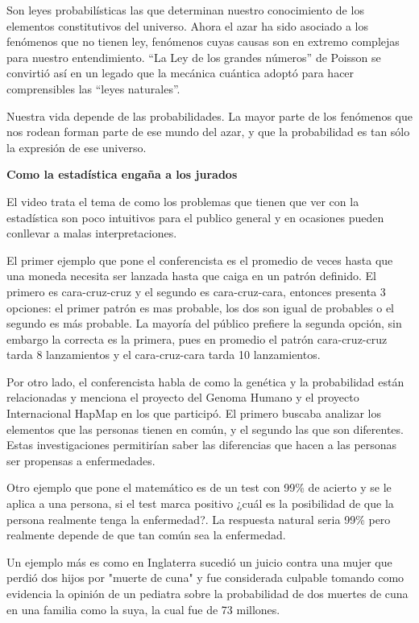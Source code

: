 \documentclass{article}[12pt]
\begin{document}
    Son leyes probabilísticas las que determinan nuestro conocimiento de los elementos constitutivos del universo. Ahora el azar ha sido asociado a los fenómenos que no tienen ley, fenómenos cuyas causas son en extremo complejas para nuestro entendimiento. ``La Ley de los grandes números'' de Poisson se convirtió así en un legado que la mecánica cuántica adoptó para hacer comprensibles las ``leyes naturales''.

    Nuestra vida depende de las probabilidades. La mayor parte de los fenómenos que nos rodean forman parte de ese mundo del azar, y que la probabilidad es tan sólo la expresión de ese universo.
    
    \newpage
    \begin{center}
        \large \textbf{Como la estadística engaña a los jurados}
    \end{center}

    El video trata el tema de como los problemas que tienen que ver con la estadística son poco intuitivos para el publico general y en ocasiones pueden conllevar a malas interpretaciones. 

    El primer ejemplo que pone el conferencista es el promedio de veces hasta que una moneda necesita ser lanzada hasta que caiga en un patrón definido. El primero es cara-cruz-cruz y el segundo es cara-cruz-cara, entonces presenta 3 opciones: el primer patrón es mas probable, los dos son igual de probables o el segundo es más probable. La mayoría del público prefiere la segunda opción, sin embargo la correcta es la primera, pues en promedio el patrón cara-cruz-cruz tarda 8 lanzamientos y el cara-cruz-cara tarda 10 lanzamientos. 

    Por otro lado, el conferencista habla de como la genética y la probabilidad están relacionadas y menciona el proyecto del Genoma Humano y  el proyecto Internacional HapMap en los que participó.  El primero buscaba analizar los elementos que las personas tienen en común, y el segundo las que son diferentes. Estas investigaciones permitirían saber las diferencias que hacen a las personas ser propensas a enfermedades.

    Otro ejemplo que pone el matemático es de un test con 99\% de acierto y se le aplica a una persona, si el test marca positivo ¿cuál es la posibilidad de que la persona realmente tenga la enfermedad?. La respuesta natural seria 99\% pero realmente depende de que tan común sea la enfermedad. 

    Un ejemplo más es como en Inglaterra sucedió un juicio contra una mujer que perdió dos hijos por "muerte de cuna" y fue considerada culpable tomando como evidencia la opinión de un pediatra sobre la probabilidad de dos muertes de cuna en una familia como la suya, la cual fue de 73 millones. 
\end{document}
